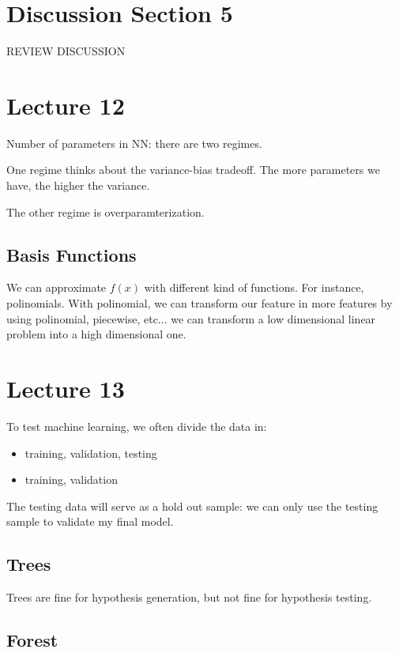 \documentclass{article}
\begin{document}
\section*{Discussion Section 5}

REVIEW DISCUSSION

\section{Lecture 12}

Number of parameters in NN: there are two regimes.

One regime thinks about the variance-bias tradeoff. The more parameters we have, the higher the variance.

The other regime is overparamterization. 

\subsection{Basis Functions}

We can approximate $f(x)$ with different kind of functions. For instance, polinomials. With polinomial, we can transform our feature in more features by using polinomial, piecewise, etc... we can transform a low dimensional linear problem into a high dimensional one.

\section{Lecture 13}

To test machine learning, we often divide the data in:
\begin{itemize}
    \item training, validation, testing
    \item training, validation
\end{itemize}

The testing data will serve as a hold out sample: we can only use the testing sample to validate my final model.

\subsection{Trees}
Trees are fine for hypothesis generation, but not fine for hypothesis testing.

\subsection{Forest}
\end{document}
